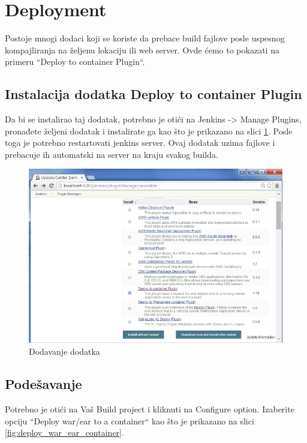 
\section{Deployment}

Postoje mnogi dodaci koji se koriste da prebace build fajlove posle uspesnog kompajliranja na željenu lokaciju ili web server. Ovde ćemo to pokazati na primeru ``Deploy to container Plugin``. 

\subsection{Instalacija dodatka Deploy to container Plugin}

Da bi se instalirao taj dodatak, potrebno je otići na Jenkins -> Manage Plugins, pronađete željeni dodatak i instalirate ga kao što je prikazano na slici \ref{fig:deploy_to_container_plugin}. Posle toga je potrebno restartovati jenkins server. Ovaj dodatak uzima fajlove i prebacuje ih automatski na server na kraju svakog builda.
\begin{figure}
\begin{center}
\includegraphics[scale=0.45]{slike/deploy_to_container_plugin.png}
\end{center}
\caption{Dodavanje dodatka}
\label{fig:deploy_to_container_plugin}
\end{figure}


\subsection{Podešavanje}

Potrebno je otići na Vaš Build project i kliknuti na Configure option. Izaberite opciju ``Deploy war/ear to a container`` kao što je prikazano na slici \ref{fig:deploy_war_ear_container}.

